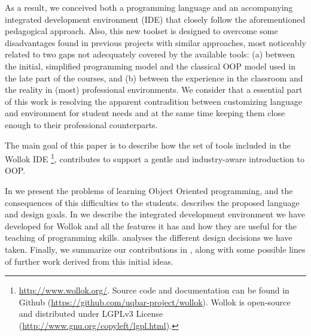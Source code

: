 As a result, we conceived both a programming language and an accompanying integrated development environment (IDE) that closely follow the aforementioned pedagogical approach. 
Also, this new toolset is designed to overcome some disadvantages 
found in previous projects with similar approaches,
most noticeably related to two gaps not adecquately covered by the available tools:
(a) between the initial, simplified programming model and the classical OOP model
used in the late part of the courses, and
(b) between the experience in the classroom and the reality in (most) professional environments.
We consider that a essential part of this work is resolving the apparent contradition
between customizing language and environment for student needs
and at the same time keeping them close enough to their professional counterparts.


The main goal of this paper is to describe how the set of tools included in the Wollok IDE%
\footnote{
	\url{http://www.wollok.org/}. 
	Source code and documentation can be found in Github 
	(\url{https://github.com/uqbar-project/wollok}).
	Wollok is open-source and distributed under LGPLv3 License 
	(\url{http://www.gnu.org/copyleft/lgpl.html}).}, 
contributes to support a gentle and industry-aware introduction to OOP.


\medskip 
In  we present the problems of learning Object Oriented programming, and the consequences of this difficulties to the students.  describes the proposed language and design goals. 
In  we describe the integrated development environment we have developed for Wollok and all the features it has and how they are useful for the teaching of programming skills.  analyses the different design decisions we have taken.
Finally, we summarize our contributions in ,
along with some possible lines of further work derived from this initial ideas. 



